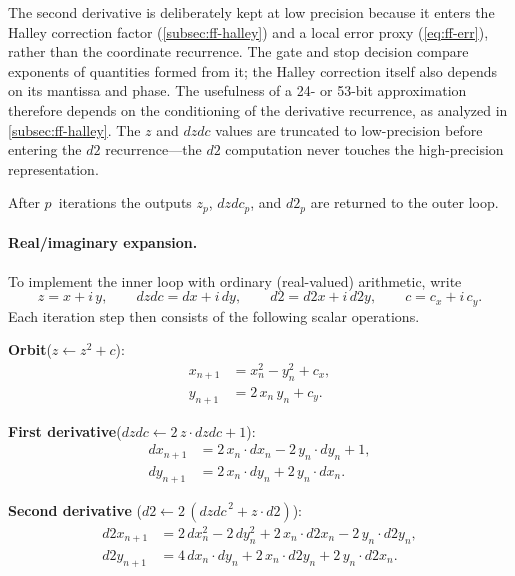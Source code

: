 The second derivative is deliberately kept at low precision because it
enters the Halley correction factor (\cref{subsec:ff-halley}) and a local
error proxy (\cref{eq:ff-err}), rather than the coordinate recurrence.
The gate and stop decision compare exponents of quantities formed from it;
the Halley correction itself also depends on its mantissa and phase.
The usefulness of a 24- or 53-bit approximation therefore depends on the
conditioning of the derivative recurrence, as analyzed in
\cref{subsec:ff-halley}.
The $z$ and $\mathit{dzdc}$ values are truncated to low-precision
 before entering the $d2$ recurrence---the $d2$
computation never touches the high-precision 
representation.

After $p$~iterations the outputs $z_p$, $\mathit{dzdc}_p$, and $d2_p$ are
returned to the outer loop.

\paragraph{Real/imaginary expansion.}
To implement the inner loop with ordinary (real-valued) arithmetic, write
\[
z = x + i\,y,\qquad
\mathit{dzdc} = dx + i\,dy,\qquad
d2 = d2x + i\,d2y,\qquad
c = c_x + i\,c_y.
\]
Each iteration step then consists of the following scalar operations.

\medskip\noindent
\textbf{Orbit}\quad ($z \leftarrow z^2 + c$):
\begin{equation}\label{eq:ff-orbit-ri}
\boxed{\begin{aligned}
x_{n+1} &= x_n^2 - y_n^2 + c_x, \\
y_{n+1} &= 2\,x_n\,y_n + c_y.
\end{aligned}}
\end{equation}

\noindent
\textbf{First derivative}\quad ($\mathit{dzdc} \leftarrow 2\,z\cdot\mathit{dzdc} + 1$):
\begin{equation}\label{eq:ff-dzdc-ri}
\boxed{\begin{aligned}
dx_{n+1} &= 2\,x_n \cdot dx_n - 2\,y_n \cdot dy_n + 1, \\
dy_{n+1} &= 2\,x_n \cdot dy_n + 2\,y_n \cdot dx_n.
\end{aligned}}
\end{equation}

\noindent
\textbf{Second derivative}\quad
($d2 \leftarrow 2\,(\mathit{dzdc}^{\,2} + z \cdot d2)$):
\begin{equation}\label{eq:ff-d2-ri}
\boxed{\begin{aligned}
d2x_{n+1} &= 2\,dx_n^2 - 2\,dy_n^2
              + 2\,x_n \cdot d2x_n - 2\,y_n \cdot d2y_n, \\
d2y_{n+1} &= 4\,dx_n \cdot dy_n
              + 2\,x_n \cdot d2y_n + 2\,y_n \cdot d2x_n.
\end{aligned}}
\end{equation}

